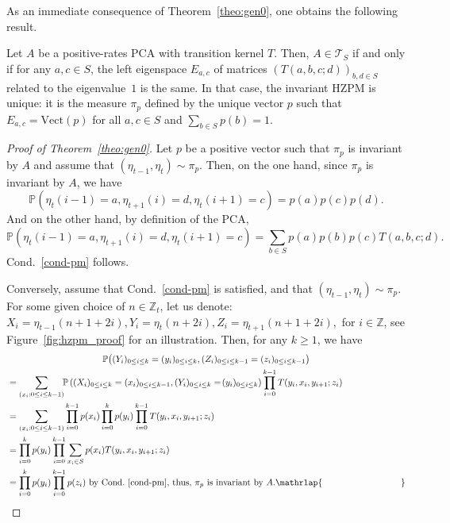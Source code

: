 \documentclass[10pt]{amsart}
\theoremstyle{definition}\newtheorem{defi}[theo]{Definition}\newtheorem{rema}[theo]{Remark}\newtheorem{exam}[theo]{Example}\newtheorem{exem}[theo]{Example}\newtheorem{nota}[theo]{Notation}
\newcounter{a}
\newcommand{\Cond}{Cond.}
\newcommand{\triangE}[1]{\mathcal{T}_{#1}}
\newcommand{\Z}{\mathbb{Z}}
\newcommand{\Pbb}{\mathbb{P}}
\begin{document}
As an immediate consequence of Theorem~\ref{theo:gen0}, one obtains the following result.

\begin{coro}\label{theo:gen}
Let $A$ be a positive-rates PCA with transition kernel $T$. Then, $A\in \triangE{S}$ if and only if for any $a,c \in S$, the left eigenspace $E_{a,c}$ of matrices $\left(T(a,b,c;d)\right)_{b,d \in S}$ related to the eigenvalue~$1$ is the same. In that case, the invariant HZPM is unique: it is the measure $\pi_p$ defined by the unique vector $p$ such that $E_{a,c} = \text{Vect}(p)$ for all $a,c\in S$ and $\sum_{b \in S} p(b) =1$.
\end{coro}

\begin{proof}[Proof of Theorem~\ref{theo:gen0}]
Let $p$ be a positive vector such that $\pi_p$ is invariant by $A$ and assume that $(\eta_{t-1},\eta_t) \sim \pi_p$. Then, on the one hand, since $\pi_p$ is invariant by $A$, we have
\begin{equation*}
\Pbb\left(\eta_{t}(i-1)=a, \eta_{t+1}(i) = d, \eta_{t}(i+1) = c\right) = p(a) p(c) p(d).
\end{equation*}
And on the other hand, by definition of the PCA,
\begin{equation*}
\Pbb\left(\eta_{t}(i-1)=a, \eta_{t+1}(i) = d, \eta_{t}(i+1) = c\right) = \sum_{b\in S} p(a) p(b) p(c) T(a,b,c;d).
\end{equation*}
\Cond~\ref{cond-pm} follows.

Conversely, assume that \Cond~\ref{cond-pm} is satisfied, and that $(\eta_{t-1},\eta_t) \sim \pi_p$. For some given choice of $n\in\Z_{t}$, let us denote: $X_i=\eta_{t-1}(n+1+2i), Y_i=\eta_{t}(n+2i), Z_i=\eta_{t+1}(n+1+2i),$ for $i\in \Z$, see Figure~\ref{fig:hzpm_proof} for an illustration. Then, for any $k\geq 1$, we have
\begin{multline*}
\Pbb\big((Y_i)_{0\leq i\leq k}= (y_i)_{0\leq i\leq k}, (Z_i)_{0\leq i\leq k-1}=(z_i)_{0\leq i\leq k-1}\big) \\
\begin{aligned}
&= \sum_{(x_i : 0\leq i\leq k-1)}\!\! \Pbb\left((X_i)_{0\leq i\leq k}=(x_i)_{0\leq i\leq k-1}, (Y_i)_{0\leq i\leq k}=\!(y_i)_{0\leq i\leq k}\right) \prod_{i=0}^{k-1} T(y_i,x_{i},y_{i+1};z_i)\\
&= \sum_{(x_i : 0\leq i\leq k-1)} \prod_{i=0}^{k-1} p(x_i) \prod_{i=0}^{k} p(y_i) \prod_{i=0}^{k-1} T(y_i,x_{i},y_{i+1};z_i) \\
&= \prod_{i=0}^{k} p(y_i) \prod_{i=0}^{k-1} \sum_{x_i\in S} p(x_i)T(y_i,x_{i},y_{i+1};z_i) \\
&= \prod_{i=0}^{k} p(y_i) \prod_{i=0}^{k-1} p(z_i) \text{ by \Cond~\ref{cond-pm}, thus, } \pi_p \text{ is invariant by } A.\mathrlap{\mkern 157mu\qed}
\end{aligned}
\end{multline*}
\let\qed\relax
\end{proof}
\end{document}
